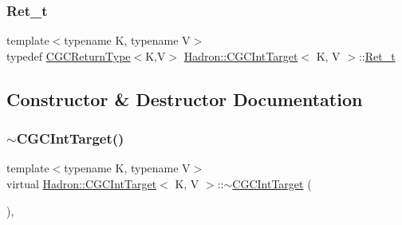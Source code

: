 \mbox{\label{classHadron_1_1CGCIntTarget_a3436ab6591c4722808ea25ced7b18c46}} 
\subsubsection{\texorpdfstring{Ret\_t}{Ret\_t}\hspace{0.1cm}{\footnotesize\ttfamily [2/2]}}
{\footnotesize\ttfamily template$<$typename K, typename V$>$ \\
typedef \mbox{\hyperlink{structHadron_1_1CGCReturnType}{C\+G\+C\+Return\+Type}}$<$K,V$>$ \mbox{\hyperlink{classHadron_1_1CGCIntTarget}{Hadron\+::\+C\+G\+C\+Int\+Target}}$<$ K, V $>$\+::\mbox{\hyperlink{classHadron_1_1CGCIntTarget_a3436ab6591c4722808ea25ced7b18c46}{Ret\+\_\+t}}}



\subsection{Constructor \& Destructor Documentation}
\mbox{\label{classHadron_1_1CGCIntTarget_a6b808ca161d3dae62109495144178541}} 
\subsubsection{\texorpdfstring{$\sim$CGCIntTarget()}{~CGCIntTarget()}\hspace{0.1cm}{\footnotesize\ttfamily [1/2]}}
{\footnotesize\ttfamily template$<$typename K, typename V$>$ \\
virtual \mbox{\hyperlink{classHadron_1_1CGCIntTarget}{Hadron\+::\+C\+G\+C\+Int\+Target}}$<$ K, V $>$\+::$\sim$\mbox{\hyperlink{classHadron_1_1CGCIntTarget}{C\+G\+C\+Int\+Target}} (\begin{DoxyParamCaption}{ }\end{DoxyParamCaption})\hspace{0.3cm}{\ttfamily [inline]}, {\ttfamily [virtual]}}




